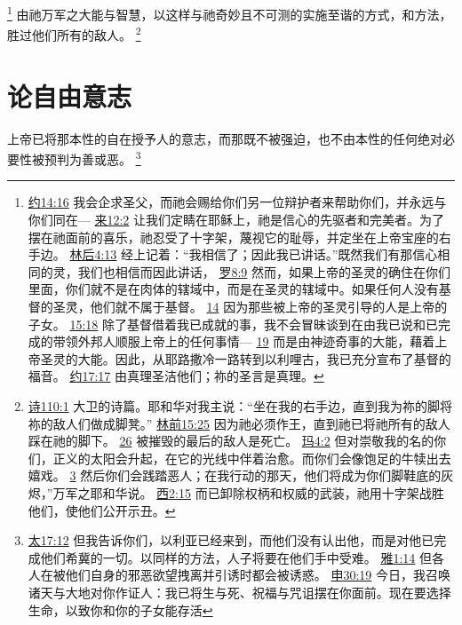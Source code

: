 \documentclass[12pt, a4paper, oneside]{ctexart}
\newcounter{parnum}[section]
\newcommand{\N}{%
   \noindent\refstepcounter{parnum}%
    \makebox[\parindent][l]{\textbf{\arabic{parnum}.}}}
\begin{document}
	\footnote {
		\href{https://biblehub.com/john/14-16.htm}{约14:16} 我会企求圣父，而祂会赐给你们另一位辩护者来帮助你们，并永远与你们同在---
		\href{https://biblehub.com/hebrews/12-2.htm}{来12:2} 让我们定睛在耶稣上，祂是信心的先驱者和完美者。为了摆在祂面前的喜乐，祂忍受了十字架，蔑视它的耻辱，并定坐在上帝宝座的右手边。
		\href{https://biblehub.com/2_corinthians/4-13.htm}{林后4:13} 经上记着：“我相信了；因此我已讲话。”既然我们有那信心相同的灵，我们也相信而因此讲话，
		\href{https://biblehub.com/romans/8-9.htm}{罗8:9} 然而，如果上帝的圣灵的确住在你们里面，你们就不是在肉体的辖域中，而是在圣灵的辖域中。如果任何人没有基督的圣灵，他们就不属于基督。
		\href{https://biblehub.com/romans/8-14.htm}{14} 因为那些被上帝的圣灵引导的人是上帝的子女。
		\href{https://biblehub.com/romans/15-18.htm}{15:18} 除了基督借着我已成就的事，我不会冒昧谈到在由我已说和已完成的带领外邦人顺服上帝上的任何事情---
		\href{https://biblehub.com/romans/15-19.htm}{19} 而是由神迹奇事的大能，藉着上帝圣灵的大能。因此，从耶路撒冷一路转到以利哩古，我已充分宣布了基督的福音。
		\href{https://biblehub.com/john/17-17.htm}{约17:17} 由真理圣洁他们；祢的圣言是真理。
	}
	由祂万军之大能与智慧，以这样与祂奇妙且不可测的实施至谐的方式，和方法，胜过他们所有的敌人。
	\footnote {
		\href{https://biblehub.com/psalms/110-1.htm}{诗110:1} 大卫的诗篇。耶和华对我主说：“坐在我的右手边，直到我为祢的脚将祢的敌人们做成脚凳。”
		\href{https://biblehub.com/1_corinthians/15-25.htm}{林前15:25} 因为祂必须作王，直到祂已将祂所有的敌人踩在祂的脚下。
		\href{https://biblehub.com/1_corinthians/15-26.htm}{26} 被摧毁的最后的敌人是死亡。
		\href{https://biblehub.com/malachi/4-2.htm}{玛4:2} 但对崇敬我的名的你们，正义的太阳会升起，在它的光线中伴着治愈。而你们会像饱足的牛犊出去嬉戏。
		\href{https://biblehub.com/malachi/4-3.htm}{3} 然后你们会践踏恶人；在我行动的那天，他们将成为你们脚鞋底的灰烬，”万军之耶和华说。
		\href{https://biblehub.com/colossians/2-15.htm}{西2:15} 而已卸除权柄和权威的武装，祂用十字架战胜他们，使他们公开示丑。
	}

\section{论自由意志}

\N 上帝已将那本性的自在授予人的意志，而那既不被强迫，也不由本性的任何绝对必要性被预判为善或恶。
	\footnote {
		\href{https://biblehub.com/matthew/17-12.htm}{太17:12} 但我告诉你们，以利亚已经来到，而他们没有认出他，而是对他已完成他们希冀的一切。以同样的方法，人子将要在他们手中受难。
		\href{https://biblehub.com/james/1-14.htm}{雅1:14} 但各人在被他们自身的邪恶欲望拽离并引诱时都会被诱惑。
		\href{https://biblehub.com/deuteronomy/30-19.htm}{申30:19} 今日，我召唤诸天与大地对你作证人：我已将生与死、祝福与咒诅摆在你面前。现在要选择生命，以致你和你的子女能存活
	}
\end{document}
